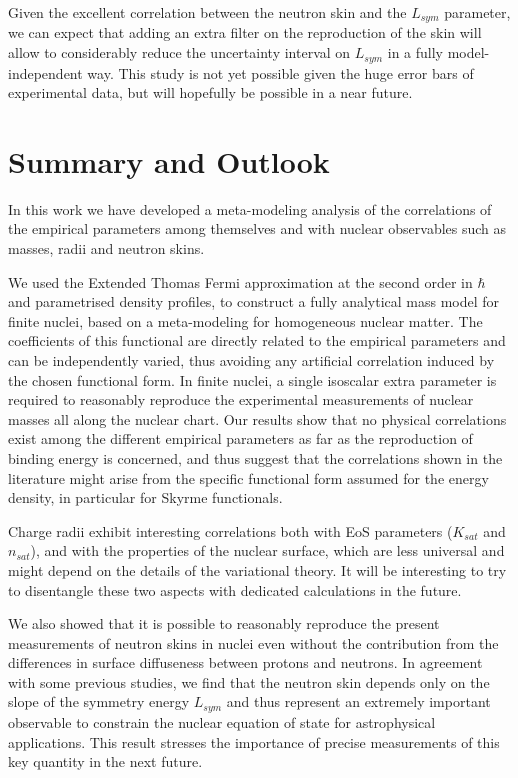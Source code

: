 \documentclass
[aps,prc,twocolumn,showpacs,showkeys,amsmath,floatfix,superscriptaddress]{revtex4}
\begin{document}
{{ Given the excellent correlation between the neutron skin and the $L_{sym}$ parameter, we can expect that adding an extra filter on the reproduction of the skin will allow to considerably reduce the uncertainty interval on $L_{sym}$
in a fully model-independent way. This study is not yet possible given the huge error bars of experimental data, 
but will hopefully be possible in a near future. 
\\ 
 
 
\section{Summary and Outlook}

In this work we have developed a meta-modeling analysis of the correlations of the empirical parameters among themselves and with nuclear observables such as masses, radii and neutron skins.

We used the Extended Thomas Fermi approximation at the second order in $\hbar$ and parametrised density profiles, to construct a fully analytical mass model for finite nuclei, based on a %
 {meta-modeling}
for homogeneous nuclear matter. 
The coefficients of this functional are directly related to the empirical parameters and can be independently varied, thus avoiding any artificial correlation induced by the chosen functional form.
In finite nuclei, a single isoscalar extra parameter is required  to reasonably reproduce the
experimental measurements of nuclear masses all along the nuclear chart.  
Our results show that no physical correlations exist among the different empirical parameters as far as the reproduction of binding energy is concerned, and thus suggest that the correlations shown in the literature might arise from the specific functional form assumed for the energy density, in particular for Skyrme functionals.

Charge radii exhibit interesting correlations both with EoS parameters ($K_{sat}$ and $n_{sat}$), and with the properties of the nuclear surface, which are less universal and might depend on the details of the variational theory.
It will be interesting to try to disentangle these two aspects with dedicated calculations in the future.  

We also showed that it is possible to reasonably reproduce the present measurements of neutron skins in nuclei even without the contribution from the differences in surface diffuseness between protons and neutrons.
In agreement with some previous studies, we find that the neutron skin depends only on the slope of the symmetry energy $L_{sym}$ and thus represent an extremely important observable to constrain the nuclear equation of state for astrophysical applications.  This result stresses the importance of precise measurements of this key quantity in the next future\cite{prex,Tarbert}.
  \\

}}
\end{document}
